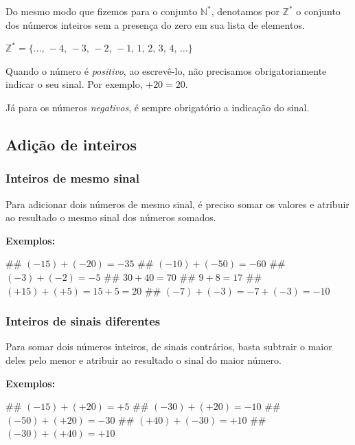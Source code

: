\documentclass{exam}
\begin{document}
\begin{multicols*}{2}
Do mesmo modo que fizemos para o conjunto $\mathbb{N^*}$, denotamos por $\mathbb{Z^*}$ o conjunto dos números inteiros sem a presença do zero em sua lista de elementos.

\begin{center}
	$\mathbb{Z^*} = \{\ldots,\, -4,\, -3,\, -2,\, -1,\, 1,\, 2,\, 3,\, 4,\, \ldots\}$	
\end{center}


Quando o número é \textit{positivo}, ao escrevê-lo, não precisamos obrigatoriamente indicar o seu sinal. Por exemplo, $+20 = 20$.

Já para os números \textit{negativos}, é sempre obrigatório a indicação do sinal.


	\subsection{Adição de inteiros}

		\subsubsection{Inteiros de mesmo sinal}
		
		Para adicionar dois números de mesmo sinal, é preciso somar os valores e atribuir ao resultado o mesmo sinal dos números somados.
		
		\textbf{Exemplos:}
		
		\begin{easylist}[enumerate]
			## $(-15)+(-20)=-35$
			## $(-10)+(-50)=-60$
			## $(-3)+(-2)=-5$
			## $30+40=70$
			## $9+8=17$
			## $(+15)+(+5) = 15+5 = 20$
			## $(-7)+(-3)= -7+(-3)=-10$
						
		\end{easylist}
		

		\subsubsection{Inteiros de sinais diferentes}
		
		Para somar dois números inteiros, de sinais contrários, basta subtrair o maior deles pelo menor e atribuir ao resultado o sinal do maior número.
		
		\textbf{Exemplos:}
		
		\begin{easylist}[enumerate]
			## $(-15)+(+20)=+5$
			## $(-30)+(+20)=-10$
			## $(-50)+(+20)=-30$
			## $(+40)+(-30)=+10$
			## $(-30)+(+40)=+10$			
				
		\end{easylist}



	\end{multicols*}
\end{document}
